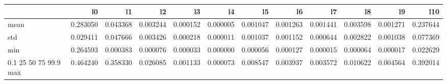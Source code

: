 \begin{tabular}{lrrrrrrrrrrr}
\toprule
 & l0 & l1 & l2 & l3 & l4 & l5 & l6 & l7 & l8 & l9 & l10 \\
\midrule
mean & 0.283050 & 0.043368 & 0.003244 & 0.000152 & 0.000005 & 0.001047 & 0.001263 & 0.001441 & 0.003598 & 0.001271 & 0.237644 \\
std & 0.029411 & 0.047666 & 0.003426 & 0.000218 & 0.000011 & 0.001037 & 0.001152 & 0.000644 & 0.002822 & 0.001038 & 0.077369 \\
min & 0.264593 & 0.000383 & 0.000076 & 0.000033 & 0.000000 & 0.000056 & 0.000127 & 0.000015 & 0.000064 & 0.000017 & 0.022629 \\
0.1%
25%
50%
75%
99.9%
max & 0.464240 & 0.358330 & 0.026085 & 0.001133 & 0.000073 & 0.008547 & 0.003937 & 0.003572 & 0.010622 & 0.004564 & 0.392014 \\
\bottomrule
\end{tabular}
